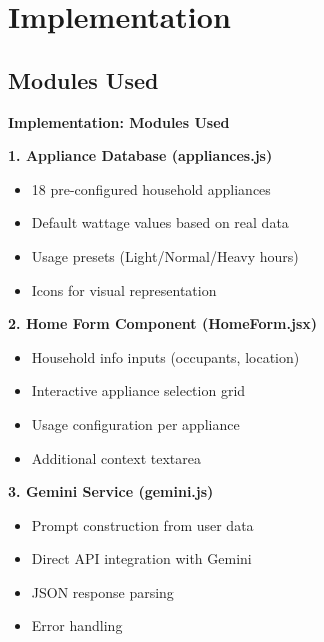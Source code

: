 \documentclass[11pt,aspectratio=169,notes,mathserif]{beamer}
\begin{document}
\section{Implementation}
\subsection{Modules Used}
\begin{frame}{\textbf{Implementation: Modules Used}}
    \justifying
    
    \begin{block}{\textbf{1. Appliance Database (appliances.js)}}
        \begin{itemize}
            \item 18 pre-configured household appliances
            \item Default wattage values based on real data
            \item Usage presets (Light/Normal/Heavy hours)
            \item Icons for visual representation
        \end{itemize}
    \end{block}
    
    \begin{block}{\textbf{2. Home Form Component (HomeForm.jsx)}}
        \begin{itemize}
            \item Household info inputs (occupants, location)
            \item Interactive appliance selection grid
            \item Usage configuration per appliance
            \item Additional context textarea
        \end{itemize}
    \end{block}
    
    \begin{block}{\textbf{3. Gemini Service (gemini.js)}}
        \begin{itemize}
            \item Prompt construction from user data
            \item Direct API integration with Gemini
            \item JSON response parsing
            \item Error handling
        \end{itemize}
    \end{block}
\end{frame}
\end{document}
